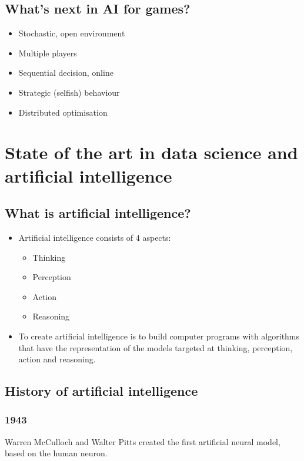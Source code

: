 \documentclass[11pt]{article}
\begin{document}
\subsection{What's next in AI for games?}
\label{sec:org520f1c5}
\begin{itemize}
\item Stochastic, open environment
\item Multiple players
\item Sequential decision, online
\item Strategic (selfish) behaviour
\item Distributed optimisation
\end{itemize}

 \newpage
\section{State of the art in data science and artificial intelligence}
\label{sec:org68cf77d}

\subsection{What is artificial intelligence?}
\label{sec:org3ac58ec}
\begin{itemize}
\item Artificial intelligence consists of 4 aspects:
\begin{itemize}
\item Thinking
\item Perception
\item Action
\item Reasoning
\end{itemize}
\item To create artificial intelligence is to build computer programs with algorithms that have the representation of the models targeted at thinking, perception, action and reasoning.
\end{itemize}
\subsection{History of artificial intelligence}
\label{sec:orgd3d1bab}

\subsubsection{1943}
\label{sec:org60a200f}
Warren McCulloch and Walter Pitts created the first artificial neural model, based on the human neuron.
\end{document}

